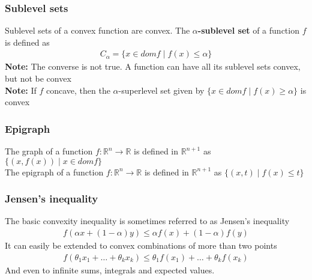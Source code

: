 \documentclass{article}
\begin{document}
\subsubsection{Sublevel sets}
Sublevel sets of a convex function are convex. The \textbf{$\alpha$-sublevel set} of a function $f$ is defined as
\begin{align*}
  C_\alpha = \{x \in dom f \mid f(x) \leq \alpha \}
\end{align*}
\textbf{Note:} The converse is not true. A function can have all its sublevel sets convex, but not be convex\\
\textbf{Note:} If $f$ concave, then the $\alpha$-superlevel set given by $\{x \in dom f \mid f(x) \geq \alpha \}$ is convex
\subsubsection{Epigraph}
The graph of a function $f: \mathbb{R}^n \rightarrow \mathbb{R}$ is defined in $\mathbb{R}^{n+1}$ as $\{(x, f(x)) \mid x \in dom f\}$\\
The epigraph of a function $f: \mathbb{R}^n \rightarrow \mathbb{R}$ is defined in $\mathbb{R}^{n+1}$ as $\{(x, t) \mid f(x) \leq t\}$
\subsubsection{Jensen's inequality}
The basic convexity inequality is sometimes referred to as Jensen's inequality
\begin{align*}
  f(\alpha x + (1-\alpha) y) \leq \alpha f(x) + (1 - \alpha) f(y)
\end{align*}
It can easily be extended to convex combinations of more than two points 
\begin{align*}
  f(\theta_1 x_1 + \dots + \theta_k x_k) \leq \theta_1 f(x_1) + \dots + \theta_k f(x_k)
\end{align*}
And even to infinite sums, integrals and expected values. 
\end{document}

